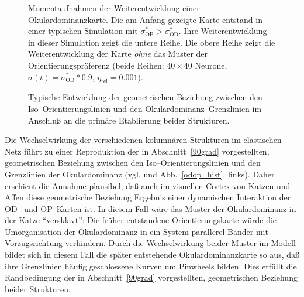 \begin{figure}[p]
\centering
\begin{sideways}
\end{sideways}
\caption{Momentaufnahmen der Weiterentwicklung einer Okulardominanzkarte.
Die am Anfang gezeigte Karte entstand in einer typischen Simulation mit
$\sigma^\ast_{\text{OP}}>\sigma^\ast_{\text{OD}}$. Ihre Weiterentwicklung in
dieser Simulation zeigt die untere Reihe. Die obere Reihe zeigt die
Weiterentwicklung der Karte \emph{ohne} das Muster der
Orientierungspräferenz (beide Reihen: $40\times 40$ Neurone,
$\sigma(t)=\sigma^\ast_{\text{OD}}*0.9$, $\eta_{\text{rel}}=0.001$).}
\label{oddev}

\begin{center}
\begin{sideways}
\end{sideways}
\end{center}
\caption{Typische Entwicklung der geometrischen Beziehung zwischen den
Iso--Orientierungslinien und den Okulardominanz--Grenzlinien im Anschluß
an die primäre Etablierung beider Strukturen.}
\label{angledev}
\end{figure}

Die Wechselwirkung der verschiedenen kolumnären Strukturen im elastischen
Netz führt zu einer Reproduktion der in Abschnitt~\ref{90grad}
vorgestellten, geometrischen Beziehung zwischen den
Iso--Orientierungslinien und den Grenzlinien der Okulardominanz
(vgl.  und Abb.~\ref{odop_hist}, links). Daher
erschient die Annahme plausibel, daß auch im visuellen Cortex von Katzen
und Affen diese geometrische Beziehung Ergebnis einer dynamischen
Interaktion der OD-- und OP--Karten ist. In diesem Fall wäre das Muster
der Okulardominanz in der Katze ``versklavt'': Die früher entstandene
Orientierungskarte würde die Umorganisation der Okulardominanz in ein
System parallerel Bänder mit Vorzugsrichtung verhindern.  Durch die
Wechselwirkung beider Muster im Modell bildet sich in diesem Fall die
später entstehende Okulardominanzkarte so aus, daß ihre Grenzlinien
häufig geschlossene Kurven um Pinwheels bilden. Dies erfüllt die
Randbedingung der in Abschnitt~\ref{90grad} vorgestellten, geometrischen
Beziehung beider Strukturen.

